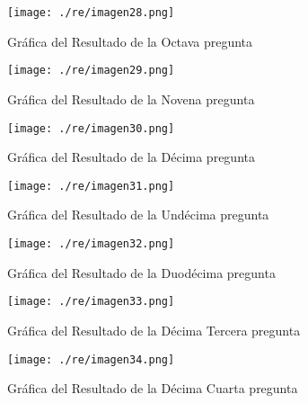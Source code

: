 \begin{figure}[H]
    \centering %
         \texttt{[image: ./re/imagen28.png]} 
    \caption{Gráfica del Resultado de la Octava pregunta \cite{GOOGLE-FORMS}}
   \label{figure:Resultado 8} %
\end{figure}
\begin{figure}[H]
    \centering %
         \texttt{[image: ./re/imagen29.png]} 
    \caption{Gráfica del Resultado de la Novena pregunta \cite{GOOGLE-FORMS}}
   \label{figure:Resultado 9} %
\end{figure}
\begin{figure}[H]
    \centering %
         \texttt{[image: ./re/imagen30.png]} 
    \caption{Gráfica del Resultado de la Décima pregunta \cite{GOOGLE-FORMS}}
   \label{figure:Resultado 10} %
\end{figure}
\begin{figure}[H]
    \centering %
         \texttt{[image: ./re/imagen31.png]} 
    \caption{Gráfica del Resultado de la Undécima pregunta \cite{GOOGLE-FORMS}}
   \label{figure:Resultado 10} %
\end{figure}
\begin{figure}[H]
    \centering %
         \texttt{[image: ./re/imagen32.png]} 
    \caption{Gráfica del Resultado de la Duodécima pregunta \cite{GOOGLE-FORMS}}
   \label{figure:Resultado 10} %
\end{figure}
\begin{figure}[H]
    \centering %
         \texttt{[image: ./re/imagen33.png]} 
    \caption{Gráfica del Resultado de la Décima Tercera pregunta \cite{GOOGLE-FORMS}}
   \label{figure:Resultado 10} %
\end{figure}
\begin{figure}[H]
    \centering %
         \texttt{[image: ./re/imagen34.png]} 
    \caption{Gráfica del Resultado de la Décima Cuarta pregunta \cite{GOOGLE-FORMS}}
   \label{figure:Resultado 10} %
\end{figure}

